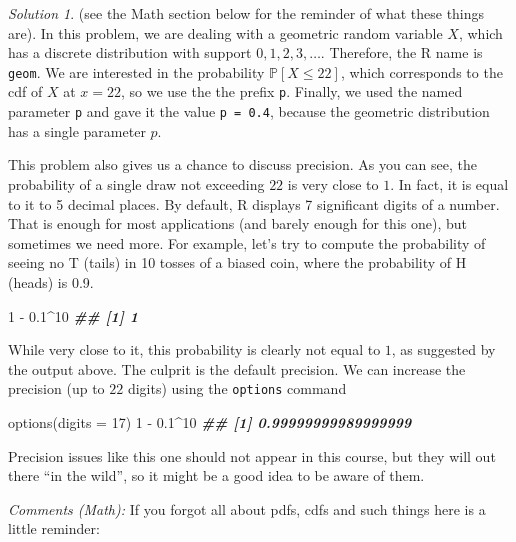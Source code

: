 \documentclass[
]{book}
\newenvironment{Shaded}{\begin{snugshade}}{\end{snugshade}}
\newcommand{\AttributeTok}[1]{\textcolor[rgb]{0.77,0.63,0.00}{#1}}
\newcommand{\DecValTok}[1]{\textcolor[rgb]{0.00,0.00,0.81}{#1}}
\newcommand{\DocumentationTok}[1]{\textcolor[rgb]{0.56,0.35,0.01}{\textbf{\textit{#1}}}}
\newcommand{\FloatTok}[1]{\textcolor[rgb]{0.00,0.00,0.81}{#1}}
\newcommand{\FunctionTok}[1]{\textcolor[rgb]{0.00,0.00,0.00}{#1}}
\newcommand{\NormalTok}[1]{#1}
\newcommand{\SpecialCharTok}[1]{\textcolor[rgb]{0.00,0.00,0.00}{#1}}
\theoremstyle{definition}
\theoremstyle{definition}
\theoremstyle{definition}
\theoremstyle{definition}
\theoremstyle{remark}
\newtheorem*{solution}{Solution}
\begin{document}
\begin{solution}
(see the Math section below for the reminder of what these things are). In this
problem, we are dealing with a geometric random variable \(X\), which has a
discrete distribution with support \(0,1,2,3,\dots\). Therefore, the R name is
\texttt{geom}. We are interested in the probability \({\mathbb{P}}[ X\leq 22]\), which
corresponds to the cdf of \(X\) at \(x=22\), so we use the
the prefix \texttt{p}. Finally, we used the named parameter \texttt{p} and gave it the value \texttt{p\ =\ 0.4}, because the geometric distribution has a single parameter \(p\).

This problem also gives us a chance to discuss precision. As you can see, the
probability of a single draw not exceeding \(22\) is very close to \(1\). In fact,
it is equal to it to 5 decimal places. By default, R displays 7 significant
digits of a number. That is enough for most applications (and barely enough for
this one), but sometimes we need more. For example, let's try to compute the
probability of seeing no T (tails) in 10 tosses of a biased coin, where the
probability of H (heads) is 0.9.

\begin{Shaded}
\begin{Highlighting}[]
\DecValTok{1} \SpecialCharTok{{-}} \FloatTok{0.1}\SpecialCharTok{\^{}}\DecValTok{10}
\DocumentationTok{\#\# [1] 1}
\end{Highlighting}
\end{Shaded}

While very close to it, this probability is clearly not equal to \(1\), as suggested by the output above.
The culprit is the default precision. We can increase the precision (up to \(22\) digits) using the \texttt{options} command

\begin{Shaded}
\begin{Highlighting}[]
\FunctionTok{options}\NormalTok{(}\AttributeTok{digits =} \DecValTok{17}\NormalTok{)}
\DecValTok{1} \SpecialCharTok{{-}} \FloatTok{0.1}\SpecialCharTok{\^{}}\DecValTok{10}
\DocumentationTok{\#\# [1] 0.99999999989999999}
\end{Highlighting}
\end{Shaded}

Precision issues like this one should not appear in this course, but they will
out there ``in the wild'', so it might be a good idea to be aware of them.

\emph{Comments (Math):} If you forgot all about pdfs, cdfs and such things here is a little reminder:


\end{solution}
\end{document}
